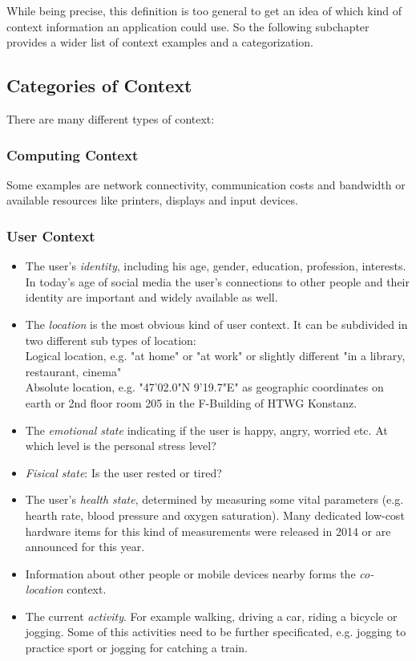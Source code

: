 While being precise, this definition is too general to get an idea of which kind of context information an application could use. So the following subchapter provides a wider list of context examples and a categorization.


\subsection{Categories of Context}

There are many different types of context: 

\subsubsection*{Computing Context}

Some examples are network connectivity, communication costs and bandwidth or available resources like printers, displays and input devices.

\subsubsection*{User Context}

\begin{itemize}
\item The user's \emph{identity}, including his age, gender, education, profession, interests. In today's age of social media the user's connections to other people and their identity are important and widely available as well.
\item The \emph{location} is the most obvious kind of user context. It can be subdivided in two different sub types of location: \\
  Logical location, e.g. "at home" or "at work" or slightly different "in a library, restaurant, cinema"\\
  Absolute location, e.g. "47'02.0"N 9'19.7"E" as geographic coordinates on earth or 2nd floor room 205 in the F-Building of HTWG Konstanz.
\item The \emph{emotional state} indicating if the user is happy, angry, worried etc. At which level is the personal stress level?
\item \emph{Fisical state}: Is the user rested or tired?
\item The user's \emph{health state}, determined by measuring some vital parameters (e.g. hearth rate, blood pressure and oxygen saturation). Many  dedicated low-cost hardware items for this kind of measurements were released in 2014 or are announced for this year. 
\item Information about other people or mobile devices nearby forms the \emph{co-location} context.
\item The current \emph{activity}. For example walking, driving a car, riding a bicycle or jogging. Some of this activities need to be further specificated, e.g. jogging to practice sport or jogging for catching a train.
\end{itemize}

